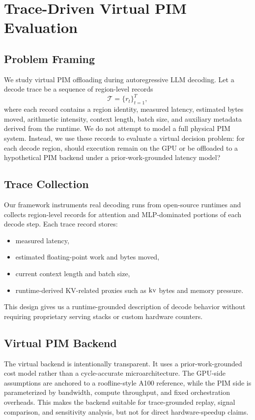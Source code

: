 \section{Trace-Driven Virtual PIM Evaluation}
\label{sec:method}

\subsection{Problem Framing}

We study virtual PIM offloading during autoregressive LLM decoding. Let a decode trace be a sequence of region-level records
\[
\mathcal{T} = \{r_t\}_{t=1}^{T},
\]
where each record contains a region identity, measured latency, estimated bytes moved, arithmetic intensity, context length, batch size, and auxiliary metadata derived from the runtime. We do not attempt to model a full physical PIM system. Instead, we use these records to evaluate a virtual decision problem: for each decode region, should execution remain on the GPU or be offloaded to a hypothetical PIM backend under a prior-work-grounded latency model?

\subsection{Trace Collection}

Our framework instruments real decoding runs from open-source runtimes and collects region-level records for attention and MLP-dominated portions of each decode step. Each trace record stores:
\begin{itemize}
\item measured latency,
\item estimated floating-point work and bytes moved,
\item current context length and batch size,
\item runtime-derived KV-related proxies such as $\mathrm{kv}$ bytes and memory pressure.
\end{itemize}
This design gives us a runtime-grounded description of decode behavior without requiring proprietary serving stacks or custom hardware counters.

\subsection{Virtual PIM Backend}

The virtual backend is intentionally transparent. It uses a prior-work-grounded cost model rather than a cycle-accurate microarchitecture. The GPU-side assumptions are anchored to a roofline-style A100 reference, while the PIM side is parameterized by bandwidth, compute throughput, and fixed orchestration overheads. This makes the backend suitable for trace-grounded replay, signal comparison, and sensitivity analysis, but not for direct hardware-speedup claims.

